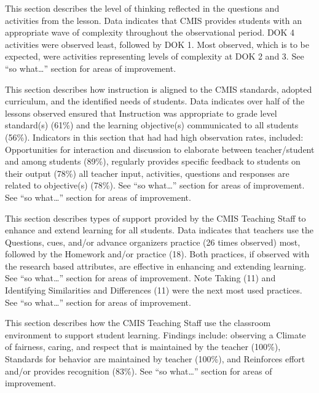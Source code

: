 \begin{findings}
This section describes the level of thinking reflected in the questions and activities from the lesson. Data indicates that CMIS provides students with an appropriate wave of complexity throughout the observational period. DOK 4 activities were observed least, followed by DOK 1. Most observed, which is to be expected, were activities representing levels of complexity at DOK 2 and 3. See “so what…” section for areas of improvement.


This section describes how instruction is aligned to the CMIS standards, adopted curriculum, and the identified needs of students. Data indicates over half of the lessons observed ensured that Instruction was appropriate to grade level standard(s) (61\%) and the learning objective(s) communicated to all students (56\%).  Indicators in this section that had had high observation rates, included: Opportunities for interaction and discussion to elaborate between teacher/student and among students (89\%), regularly provides specific feedback to students on their output  (78\%) all teacher input, activities, questions and responses are related to objective(s) (78\%). See “so what…” section for areas of improvement. See “so what…” section for areas of improvement.



This section describes types of support provided by the CMIS Teaching Staff to enhance and extend learning for all students. Data indicates that teachers use the Questions, cues, and/or advance organizers practice (26 times observed) most, followed by the Homework and/or practice (18). Both practices, if observed with the research based attributes,  are effective in enhancing and extending learning. See “so what…” section for areas of improvement. Note Taking (11) and Identifying Similarities and Differences (11) were the next most used practices.  See “so what…” section for areas of improvement.
                

This section describes how the CMIS Teaching Staff use the classroom environment to support student learning. Findings include: observing a Climate of fairness, caring, and respect that is maintained by the teacher (100\%), Standards for behavior are maintained by teacher (100\%), and 
Reinforces effort and/or provides recognition (83\%). See “so what…” section for areas of improvement.


\end{findings}
